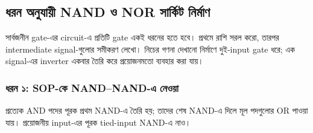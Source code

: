 \providecommand{\chLogicExample}[3]{\chThreeExample{#2}{#3}\label{ex:#1}}
\subsection{ধরন অনুযায়ী NAND ও NOR সার্কিট নির্মাণ}
সার্বজনীন gate-এর circuit-এ প্রতিটি gate একই ধরনের হতে হবে। প্রথমে রাশি সরল করো, তারপর intermediate signal-গুলোর সমীকরণ লেখো। নিচের গণনা দেখানো নির্মাণে দুই-input gate ধরে; এক signal-এর inverter একবার তৈরি করে প্রয়োজনমতো ব্যবহার করা যায়।
\subsubsection*{ধরন ১: SOP-কে NAND--NAND-এ নেওয়া}
প্রত্যেক AND পদের পূরক প্রথম NAND-এ তৈরি হয়; তাদের শেষ NAND-এ দিলে মূল পদগুলোর OR পাওয়া যায়। প্রয়োজনীয় input-এর পূরক tied-input NAND-এ নাও।
